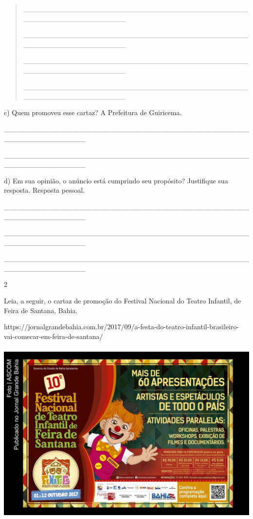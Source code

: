 \begin{itemize}
{{{\begin{itemize}
\begin{itemize}
\begin{quote}
\_\_\_\_\_\_\_\_\_\_\_\_\_\_\_\_\_\_\_\_\_\_\_\_\_\_\_\_\_\_\_\_\_\_\_\_\_\_\_\_\_\_\_\_\_\_\_\_\_\_\_\_\_\_\_\_\_\_\_\_\_\_\_\_

\_\_\_\_\_\_\_\_\_\_\_\_\_\_\_\_\_\_\_\_\_\_\_\_\_\_\_\_\_\_\_\_\_\_\_\_\_\_\_\_\_\_\_\_\_\_\_\_\_\_\_\_\_\_\_\_\_\_\_\_\_\_\_\_

\_\_\_\_\_\_\_\_\_\_\_\_\_\_\_\_\_\_\_\_\_\_\_\_\_\_\_\_\_\_\_\_\_\_\_\_\_\_\_\_\_\_\_\_\_\_\_\_\_\_\_\_\_\_\_\_\_\_\_\_\_\_\_\_

\_\_\_\_\_\_\_\_\_\_\_\_\_\_\_\_\_\_\_\_\_\_\_\_\_\_\_\_\_\_\_\_\_\_\_\_\_\_\_\_\_\_\_\_\_\_\_\_\_\_\_\_\_\_\_\_\_\_\_\_\_\_\_\_
\end{quote}

c) Quem promoveu esse cartaz? A Prefeitura de Guiricema.

\_\_\_\_\_\_\_\_\_\_\_\_\_\_\_\_\_\_\_\_\_\_\_\_\_\_\_\_\_\_\_\_\_\_\_\_\_\_\_\_\_\_\_\_\_\_\_\_\_\_\_\_\_\_\_\_\_\_\_\_\_\_\_\_

\_\_\_\_\_\_\_\_\_\_\_\_\_\_\_\_\_\_\_\_\_\_\_\_\_\_\_\_\_\_\_\_\_\_\_\_\_\_\_\_\_\_\_\_\_\_\_\_\_\_\_\_\_\_\_\_\_\_\_\_\_\_\_\_

d) Em sua opinião, o anúncio está cumprindo seu propósito? Justifique
sua resposta. Resposta pessoal.

\_\_\_\_\_\_\_\_\_\_\_\_\_\_\_\_\_\_\_\_\_\_\_\_\_\_\_\_\_\_\_\_\_\_\_\_\_\_\_\_\_\_\_\_\_\_\_\_\_\_\_\_\_\_\_\_\_\_\_\_\_\_\_\_

\_\_\_\_\_\_\_\_\_\_\_\_\_\_\_\_\_\_\_\_\_\_\_\_\_\_\_\_\_\_\_\_\_\_\_\_\_\_\_\_\_\_\_\_\_\_\_\_\_\_\_\_\_\_\_\_\_\_\_\_\_\_\_\_

\_\_\_\_\_\_\_\_\_\_\_\_\_\_\_\_\_\_\_\_\_\_\_\_\_\_\_\_\_\_\_\_\_\_\_\_\_\_\_\_\_\_\_\_\_\_\_\_\_\_\_\_\_\_\_\_\_\_\_\_\_\_\_\_

\num{2}

Leia, a seguir, o cartaz de promoção do Festival Nacional do Teatro
Infantil, de Feira de Santana, Bahia.

https://jornalgrandebahia.com.br/2017/09/a-festa-do-teatro-infantil-brasileiro-vai-comecar-em-feira-de-santana/
\includegraphics[width=5.90556in,height=3.93681in]{media/image15.jpeg}


\end{itemize}
\end{itemize}}}}
\end{itemize}
